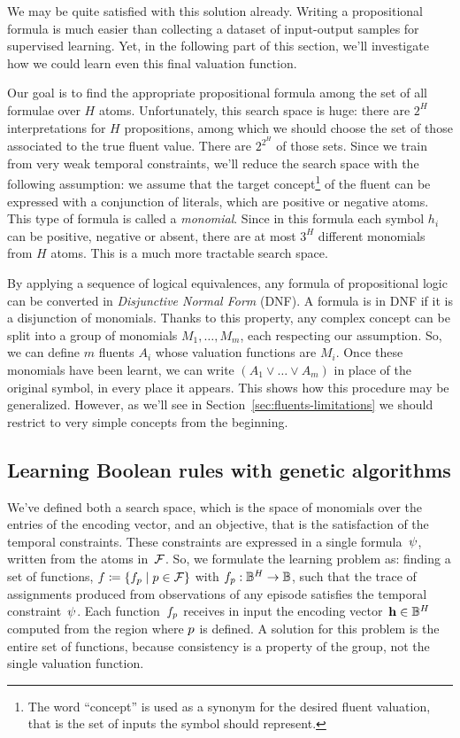 We may be quite satisfied with this solution already. Writing a propositional
formula is much easier than collecting a dataset of input-output samples for
supervised learning. Yet, in the following part of this section, we'll
investigate how we could learn even this final valuation function.

Our goal is to find the appropriate propositional formula among the set of all
formulae over $H$ atoms. Unfortunately, this search space is huge: there are
$2^H$ interpretations for $H$ propositions, among which we should choose the
set of those associated to the true fluent value. There are $2^{2^H}$ of those
sets. Since we train from very weak temporal constraints, we'll reduce the
search space with the following assumption: we assume that the target
concept\footnote{The word ``concept'' is used as a synonym for the desired
fluent valuation, that is the set of inputs the symbol should represent.} of
the fluent can be expressed with a conjunction of literals, which are positive
or negative atoms. This type of formula is called a \emph{monomial}. Since in
this formula each symbol $h_i$ can be positive, negative or absent, there are
at most $3^H$ different monomials from $H$ atoms. This is a much more
tractable search space.

By applying a sequence of logical equivalences, any formula of propositional
logic can be converted in \emph{Disjunctive Normal Form}
(DNF). A formula is in DNF if it is
a disjunction of monomials. Thanks to this property, any complex concept can
be split into a group of monomials $M_1, \dots, M_m$, each respecting our
assumption. So, we can define $m$ fluents $A_i$ whose valuation functions are
$M_i$. Once these monomials have been learnt, we can write $(A_1 \lor \dots
\lor A_m)$ in place of the original symbol, in every place it appears. This
shows how this procedure may be generalized. However, as we'll see in
Section~\ref{sec:fluents-limitations} we should restrict to very simple
concepts from the beginning.


\subsection{Learning Boolean rules with genetic algorithms}

We've defined both a search space, which is the space of monomials over the
entries of the encoding vector, and an objective, that is the satisfaction of
the temporal constraints. These constraints are expressed in a single \ldl{}
formula~$\psi$, written from the atoms in~$\mathcal{F}$. So, we formulate
the learning problem as: finding a set of functions, $f \coloneqq
\{f_p \mid p \in \mathcal{F}\}$ with $f_p: \mathbb{B}^H \to \mathbb{B}$,
such that the trace of assignments produced from observations of any episode
satisfies the temporal constraint~$\psi$. Each function~$f_p$
receives in input the encoding vector~$\mathbf{h} \in \mathbb{B}^H$ computed from the region
where $p$ is defined. A solution for this problem is the entire set of
functions, because consistency is a property of the group, not the single
valuation function.

